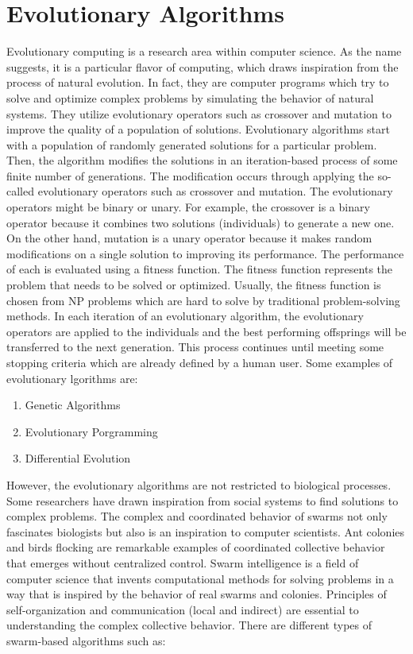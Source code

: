 \section{Evolutionary Algorithms}
Evolutionary computing is a research area within computer science. As the name suggests, it is a particular flavor of computing, which draws inspiration from the process of natural evolution. In fact, they are computer programs which try to solve and optimize complex problems by simulating the behavior of natural systems. They utilize evolutionary operators such as crossover and mutation to improve the quality of a population of solutions. \newline
Evolutionary algorithms start with a population of randomly generated solutions for a particular problem. Then, the algorithm modifies the solutions in an iteration-based process of some finite number of generations. The modification occurs through applying the so-called evolutionary operators such as crossover and mutation. The evolutionary operators might be binary or unary. For example, the crossover is a binary operator because it combines two solutions (individuals) to generate a new one. On the other hand, mutation is a unary operator because it makes random modifications on a single solution to improving its performance. The performance of each is evaluated using a fitness function. The fitness function represents the problem that needs to be solved or optimized. Usually, the fitness function is chosen from NP problems which are hard to solve by traditional problem-solving methods. In each iteration of an evolutionary algorithm, the evolutionary operators are applied to the individuals and the best performing offsprings will be transferred to the next generation. This process continues until meeting some stopping criteria which are already defined by a human user. Some examples of evolutionary lgorithms are:
\begin{enumerate}
	\item Genetic Algorithms
	\item Evolutionary Porgramming
	\item Differential Evolution
\end{enumerate}
However, the evolutionary algorithms are not restricted to biological processes. Some researchers have drawn inspiration from social systems to find solutions to complex problems. The complex and coordinated behavior of swarms not only fascinates biologists but also is an inspiration to computer scientists. Ant colonies and birds flocking are remarkable examples of coordinated collective behavior that emerges without centralized control. Swarm intelligence is a field of computer science that invents computational methods for solving problems in a way that is inspired by the behavior of real swarms and colonies. Principles of self-organization and communication (local and indirect) are essential to understanding the complex collective behavior. There are different types of swarm-based algorithms such as:

